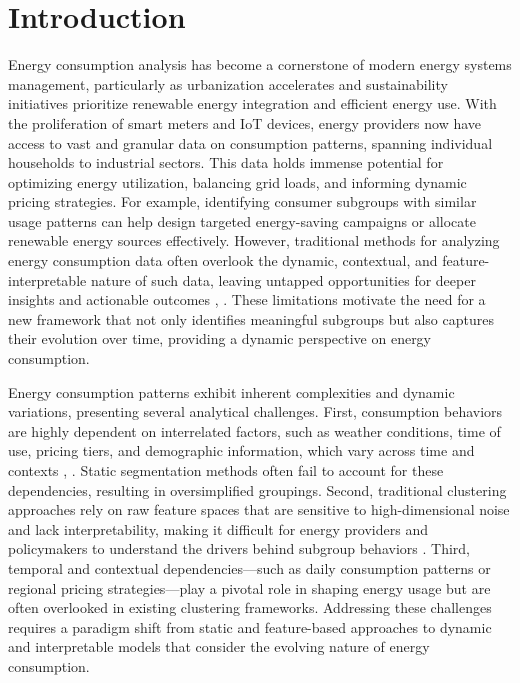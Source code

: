 \documentclass[final,5p,times,twocolumn,numbers]{elsarticle}
\begin{document}
\section{Introduction}
\label{sec:intr}
Energy consumption analysis has become a cornerstone of modern energy systems management, particularly as urbanization accelerates and sustainability initiatives prioritize renewable energy integration and efficient energy use. With the proliferation of smart meters and IoT devices, energy providers now have access to vast and granular data on consumption patterns, spanning individual households to industrial sectors. This data holds immense potential for optimizing energy utilization, balancing grid loads, and informing dynamic pricing strategies. For example, identifying consumer subgroups with similar usage patterns can help design targeted energy-saving campaigns or allocate renewable energy sources effectively. However, traditional methods for analyzing energy consumption data often overlook the dynamic, contextual, and feature-interpretable nature of such data, leaving untapped opportunities for deeper insights and actionable outcomes \cite{c1}, \cite{c2}. These limitations motivate the need for a new framework that not only identifies meaningful subgroups but also captures their evolution over time, providing a dynamic perspective on energy consumption.

Energy consumption patterns exhibit inherent complexities and dynamic variations, presenting several analytical challenges. First, consumption behaviors are highly dependent on interrelated factors, such as weather conditions, time of use, pricing tiers, and demographic information, which vary across time and contexts \cite{c3}, \cite{c4}. Static segmentation methods often fail to account for these dependencies, resulting in oversimplified groupings. Second, traditional clustering approaches rely on raw feature spaces that are sensitive to high-dimensional noise and lack interpretability, making it difficult for energy providers and policymakers to understand the drivers behind subgroup behaviors \cite{c5}. Third, temporal and contextual dependencies—such as daily consumption patterns or regional pricing strategies—play a pivotal role in shaping energy usage but are often overlooked in existing clustering frameworks. Addressing these challenges requires a paradigm shift from static and feature-based approaches to dynamic and interpretable models that consider the evolving nature of energy consumption.
\end{document}
